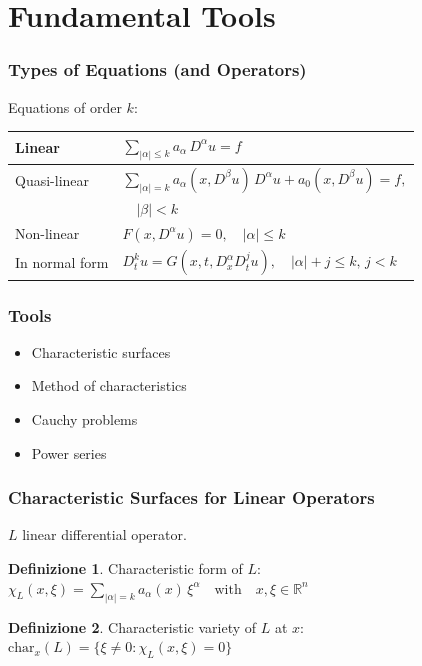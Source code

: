 \documentclass[serif,notheorems]{beamer}
\theoremstyle{definition} %
\newtheorem{definition}{Definizione}[section] %
\theoremstyle{remark}
\begin{document}
\section{Fundamental Tools}

\begin{frame}
\frametitle{Types of Equations (and Operators)}
Equations of order $k$:
\begin{table}
\renewcommand{\arraystretch}{2}
\begin{tabular}{l l} 
\hline \hline
 Linear & $\sum_{|\alpha |\leq k} a_\alpha \, D^\alpha u = f$ \\
 \hline
 \vspace{-2mm}
 Quasi-linear & $\sum_{|\alpha |= k} a_\alpha (x,D^\beta u) \, D^\alpha u +  a_0(x,D^\beta u)= f,$\\
 & $\quad |\beta |<k $ \\
 \hline
 Non-linear & $F(x,D^\alpha u)=0, \quad |\alpha | \leq k$ \\
 \hline
 In normal form & $D_{t}^k u = G(x,t, D^\alpha_x D^j_t u), \quad |\alpha |+j \leq k, \, j < k$ \\
 \hline \hline
\end{tabular}
\end{table}
\end{frame}

\begin{frame}
\frametitle{Tools}
\begin{itemize}
\item Characteristic surfaces
\item Method of characteristics
\item Cauchy problems
\item Power series
\end{itemize}
\end{frame}

\begin{frame}
\frametitle{Characteristic Surfaces for Linear Operators}
$L$ linear differential operator.
\begin{definition}
Characteristic form of $L$:\\ $\chi_L(x,\xi)=\sum\limits_{|\alpha |= k} a_\alpha(x) \, \xi^\alpha \quad \text{with} \quad x,\xi \in \mathbb{R}^n$
\end{definition}

\begin{definition}
Characteristic variety of $L$ at $x$:\\ $\text{char}_x (L)= \{ \xi \neq 0 : \chi_L(x,\xi)=0 \}$
\end{definition}
\end{frame}
\end{document}
